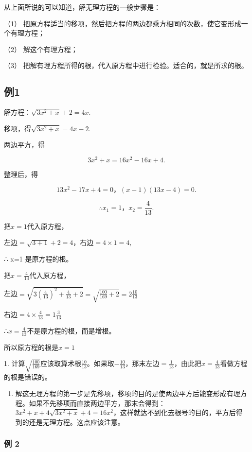 从上面所说的可以知道，解无理方程的一般步骤是：

（1）
把原方程适当的移项，然后把方程的两边都乘方相同的次数，使它变形成一个有理方程；

（2） 解这个有理方程；

（3） 把解有理方程所得的根，代入原方程中进行检验。适合的，就是所求的根。

\subsection{例1}

解方程：\(\sqrt{3x^2 + x} + 2 = 4x.\)

 移项，得\(\sqrt{3x^2 + x} = 4x - 2.\)

两边平方，得

\[
3 x ^ {2} + x = 16 x ^ {2} - 16 x + 4.
\]

整理后，得

\[
13 x ^ {2} - 17 x + 4 = 0\text{，} (x - 1) (13 x - 4) = 0.
\]

\[
\therefore x _ {1} = 1\text{，} x _ {2} = \frac{4}{13}.
\]

 把\(x = 1\)代入原方程，

左边\(= \sqrt{3 + 1} + 2 = 4\)，右边\(= 4 \times 1 = 4,\)

∴ x=1 是原方程的根。

把\(x = \frac{4}{13}\)代入原方程，

左边\(= \sqrt{3\left(\frac{4}{13}\right)^2 + \frac{4}{13} + 2} = \sqrt{\frac{100}{169} + 2} = 2\frac{10}{13}\)

右边\(= 4 \times \frac{4}{13} = 1\frac{3}{13}\)

∴\(x=\frac{4}{13}\)不是原方程的根，而是增根。

所以原方程的根是\(x = 1\)

 1.
计算\(\sqrt{\frac{100}{169}}\)应该取算术根\(\frac{10}{13}\)。如果取\(-\frac{10}{13}\)，那末左边\(= \frac{1}{13}\)，由此把\(x = \frac{4}{13}\)看做方程的根是错误的。

\begin{enumerate}[start=2]
\item
  解这无理方程的第一步是先移项，移项的目的是使两边平方后能变形成有理方程。如果不先移项而直接两边平方，那末会得到：\(3x^{2} + x + 4\sqrt{3x^{2} + x} + 4 = 16x^{2}\)，这样就达不到化去根号的目的，平方后得到的还是无理方程。这点应该注意。
\end{enumerate}

\subsubsection{例 2}

